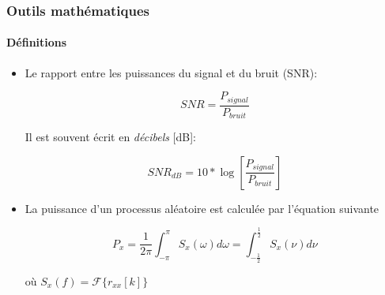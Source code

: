 \documentclass[10pt]{beamer}
\begin{document}
    
    
    \begin{frame}
    
        \frametitle{Outils mathématiques}
        \framesubtitle{Définitions}
        
        \begin{itemize}
        
        \item Le rapport entre les puissances du signal et du bruit (SNR):
        
        \begin{equation}
            SNR = \frac{P_{signal}}{P_{bruit}}
        \end{equation}
        
        Il est souvent écrit en \textit{décibels} [dB]:
        
        \begin{equation}
            \label{eq:snr}
            SNR_{dB} = 10* \log \left[ \frac{P_{signal}}{P_{bruit}} \right]
        \end{equation}
        
        \item La puissance d'un processus aléatoire est calculée par l'équation suivante
        
        \begin{equation}
            P_x = \frac{1}{2\pi} \int_{-\pi}^{\pi}  S_x (\omega) d\omega = \int_{-\frac{1}{2}}^{\frac{1}{2}}  S_x (\nu) d\nu
        \end{equation}
        
        où \(S_x(f) = \mathcal{F} \{r_{xx}[k]\}\)
        
        \end{itemize}
    \end{frame}
    
    
\end{document}
